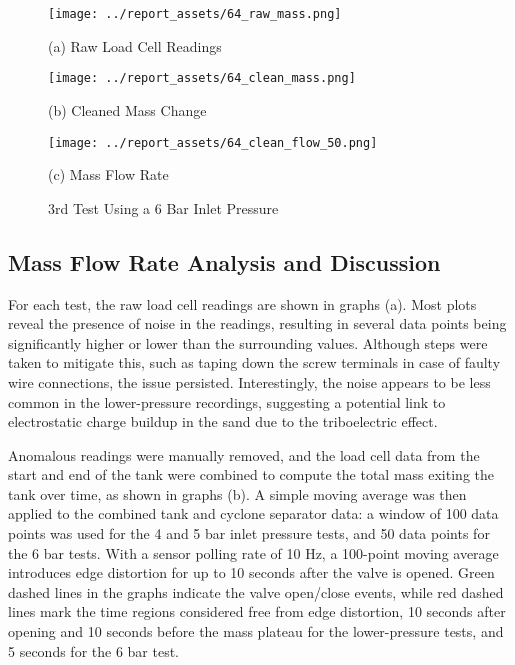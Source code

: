 \vfill
\begin{figure}[htbp]
    \centering

    \begin{minipage}{0.32\textwidth}
        \centering
        \texttt{[image: ../report\_assets/64\_raw\_mass.png]}
        \caption*{(a) Raw Load Cell Readings}
    \end{minipage}
    \hfill
    \begin{minipage}{0.32\textwidth}
        \centering
        \texttt{[image: ../report\_assets/64\_clean\_mass.png]}
        \caption*{(b) Cleaned Mass Change}
    \end{minipage}
    \hfill
    \begin{minipage}{0.32\textwidth}
        \centering
        \texttt{[image: ../report\_assets/64\_clean\_flow\_50.png]}
        \caption*{(c) Mass Flow Rate}
    \end{minipage}
    \caption{3rd Test Using a 6 Bar Inlet Pressure}
    
\end{figure}\label{fig:64}
\vfill
\newpage

\subsection{Mass Flow Rate Analysis and Discussion}
For each test, the raw load cell readings are shown in graphs (a). Most plots reveal the presence of noise in the readings, resulting in several data points being significantly higher or lower than the surrounding values. Although steps were taken to mitigate this, such as taping down the screw terminals in case of faulty wire connections, the issue persisted. Interestingly, the noise appears to be less common in the lower-pressure recordings, suggesting a potential link to electrostatic charge buildup in the sand due to the triboelectric effect.

Anomalous readings were manually removed, and the load cell data from the start and end of the tank were combined to compute the total mass exiting the tank over time, as shown in graphs (b). A simple moving average was then applied to the combined tank and cyclone separator data: a window of 100 data points was used for the 4 and 5 bar inlet pressure tests, and 50 data points for the 6 bar tests. With a sensor polling rate of 10 Hz, a 100-point moving average introduces edge distortion for up to 10 seconds after the valve is opened. Green dashed lines in the graphs indicate the valve open/close events, while red dashed lines mark the time regions considered free from edge distortion, 10 seconds after opening and 10 seconds before the mass plateau for the lower-pressure tests, and 5 seconds for the 6 bar test.

